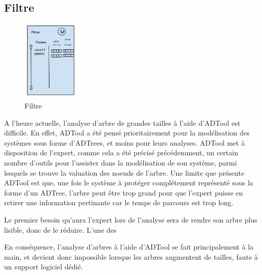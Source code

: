 	\subsection{Filtre}
		\begin{figure}
			\begin{center}
				\includegraphics[width=0.25\textwidth]{figure/filtre.png}
			\end{center}
			\caption{Filtre}
			\label{fig:filtre}
		\end{figure}

		A l'heure actuelle, l'analyse d'arbre de grandes tailles à l'aide d'ADTool est difficile. En effet, ADTool a été pensé prioritairement pour la modélisation des systèmes sous forme d'ADTrees, et moins pour leurs analyses. ADTool met à disposition de l'expert, comme cela a été précisé précédemment, un certain nombre d'outils pour l'assister dans la modélisation de son système, parmi lesquels se trouve la valuation des noeuds de l'arbre. Une limite que présente ADTool est que, une fois le système à protéger complétement représenté sous la forme d'un ADTree, l'arbre peut être trop grand pour que l'expert puisse en retirer une information pertinante car le temps de parcours est trop long. 

		Le premier besoin qu'aura l'expert lors de l'analyse sera de rendre son arbre plus lisible, donc de le réduire. L'une des 

		En conséquence, l'analyse d'arbres à l'aide d'ADTool se fait principalement à la main, et devient donc impossible lorsque les arbres augmentent de tailles, faute à un support logiciel dédié.

		

